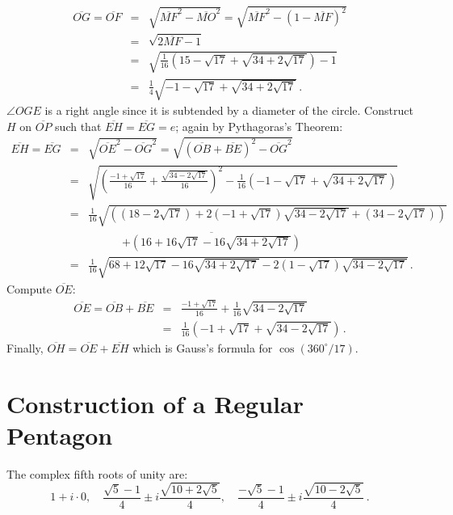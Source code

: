 \begin{eqnarray*}
\overline{OG}=\overline{OF}&=&\sqrt{\overline{MF}^2-\overline{MO}^2}=\sqrt{\overline{MF}^2-(1-\overline{MF})^2}\\
&=&\sqrt{2\overline{MF}-1}\\
&=&\sqrt{\frac{1}{16}\left(15-\sqrt{17}+\sqrt{34+2\sqrt{17}}\right)-1}\\
&=&\frac{1}{4}\sqrt{-1-\sqrt{17}+\sqrt{34+2\sqrt{17}}}\,.
\end{eqnarray*}
$\angle OGE$ is a right angle since it is subtended by a diameter of the circle. Construct $H$ on $\overline{OP}$ such that $\overline{EH}=\overline{EG}=e$; again by Pythagoras's Theorem:
\begin{eqnarray*}
\overline{EH}=\overline{EG}&=&\sqrt{\overline{OE}^2-\overline{OG}^2}=\sqrt{(\overline{OB}+\overline{BE})^2-\overline{OG}^2}\\
&=&\sqrt{\left(\frac{-1+\sqrt{17}}{16}+\frac{\sqrt{34-2\sqrt{17}}}{16}\right)^2-
\frac{1}{16}\left(-1-\sqrt{17}+\sqrt{34+2\sqrt{17}}\right)}
\\
&=&\frac{1}{16}\sqrt{\left(
(18-2\sqrt{17})+ 2(-1+\sqrt{17})\sqrt{34-2\sqrt{17}}+
(34-2\sqrt{17})\right)}\\
&&\quad\quad\quad\overline{
+\left(16+16\sqrt{17}-16\sqrt{34+2\sqrt{17}}\right)}\\
&=&\frac{1}{16}\sqrt{
68+12\sqrt{17}-16\sqrt{34+2\sqrt{17}}-2(1-\sqrt{17})\sqrt{34-2\sqrt{17}}
}\,.
\end{eqnarray*}
Compute $\overline{OE}$:
\begin{eqnarray*}
\overline{OE}=\overline{OB}+\overline{BE}&=&\frac{-1+\sqrt{17}}{16}+\frac{1}{16}\sqrt{34-2\sqrt{17}}\\
&=&\frac{1}{16}\left(-1+\sqrt{17}+\sqrt{34-2\sqrt{17}}\right)\,.
\end{eqnarray*}
Finally, $\overline{OH}=\overline{OE}+\overline{EH}$ which is Gauss's formula for $\cos (360^\circ/17)$.



\section{Construction of a Regular Pentagon}\label{s.hept-pentagon}

\begin{advanced}
The complex fifth roots of unity are:
\[
1+i\cdot 0,\quad\frac{\sqrt{5}-1}{4}\pm i \frac{\sqrt{10+2\sqrt{5}}}{4},\quad\frac{-\sqrt{5}-1}{4}\pm i \frac{\sqrt{10-2\sqrt{5}}}{4}\,.
\]
\vspace{-3ex}
\end{advanced}

